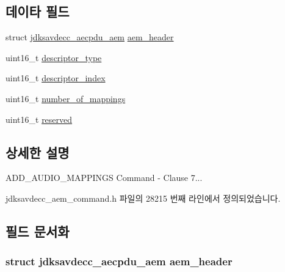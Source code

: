 \subsection*{데이타 필드}
\begin{DoxyCompactItemize}
\item 
struct \hyperlink{structjdksavdecc__aecpdu__aem}{jdksavdecc\+\_\+aecpdu\+\_\+aem} \hyperlink{structjdksavdecc__aem__command__add__audio__mappings_ae1e77ccb75ff5021ad923221eab38294}{aem\+\_\+header}
\item 
uint16\+\_\+t \hyperlink{structjdksavdecc__aem__command__add__audio__mappings_ab7c32b6c7131c13d4ea3b7ee2f09b78d}{descriptor\+\_\+type}
\item 
uint16\+\_\+t \hyperlink{structjdksavdecc__aem__command__add__audio__mappings_a042bbc76d835b82d27c1932431ee38d4}{descriptor\+\_\+index}
\item 
uint16\+\_\+t \hyperlink{structjdksavdecc__aem__command__add__audio__mappings_ac7db472c5622ef473d5d0a5c416d5531}{number\+\_\+of\+\_\+mappings}
\item 
uint16\+\_\+t \hyperlink{structjdksavdecc__aem__command__add__audio__mappings_a5a6ed8c04a3db86066924b1a1bf4dad3}{reserved}
\end{DoxyCompactItemize}


\subsection{상세한 설명}
A\+D\+D\+\_\+\+A\+U\+D\+I\+O\+\_\+\+M\+A\+P\+P\+I\+N\+GS Command -\/ Clause 7... 

jdksavdecc\+\_\+aem\+\_\+command.\+h 파일의 28215 번째 라인에서 정의되었습니다.



\subsection{필드 문서화}
\subsubsection[{\texorpdfstring{aem\+\_\+header}{aem_header}}]{\setlength{\rightskip}{0pt plus 5cm}struct {\bf jdksavdecc\+\_\+aecpdu\+\_\+aem} aem\+\_\+header}\hypertarget{structjdksavdecc__aem__command__add__audio__mappings_ae1e77ccb75ff5021ad923221eab38294}{}\label{structjdksavdecc__aem__command__add__audio__mappings_ae1e77ccb75ff5021ad923221eab38294}


